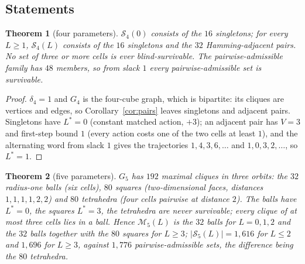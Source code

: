 \documentclass[11pt,a4paper]{article}
\theoremstyle{plain}
\newtheorem{theorem}{Theorem}[section]
\theoremstyle{definition}
\theoremstyle{remark}
\newcommand{\calM}{\mathcal{M}}
\newcommand{\calS}{\mathcal{S}}
\newcommand{\Lstar}{L^{\ast}}
\begin{document}
\subsection{Statements}
\begin{theorem}[four parameters]\label{thm:m4}
$\calS_4(0)$ consists of the $16$ singletons; for every $L\ge1$, $\calS_4(L)$ consists of the $16$ singletons and the $32$ Hamming-adjacent pairs. No set of three or more cells is ever blind-survivable. The pairwise-admissible family has $48$ members, so from slack $1$ every pairwise-admissible set is survivable.
\end{theorem}
\begin{proof}
$\delta_4=1$ and $G_4$ is the four-cube graph, which is bipartite: its cliques are vertices and edges, so Corollary~\ref{cor:pairs} leaves singletons and adjacent pairs. Singletons have $\Lstar=0$ (constant matched action, $+3$); an adjacent pair has $V=3$ and first-step bound $1$ (every action costs one of the two cells at least $1$), and the alternating word from slack $1$ gives the trajectories $1,4,3,6,\dots$ and $1,0,3,2,\dots$, so $\Lstar=1$.
\end{proof}

\begin{theorem}[five parameters]\label{thm:m5}
$G_5$ has $192$ maximal cliques in three orbits: the $32$ radius-one balls (six cells), $80$ \emph{squares} (two-dimensional faces, distances $1,1,1,1,2,2$) and $80$ \emph{tetrahedra} (four cells pairwise at distance $2$). The balls have $\Lstar=0$, the squares $\Lstar=3$, the tetrahedra are never survivable; every clique of at most three cells lies in a ball. Hence $\calM_5(L)$ is the $32$ balls for $L=0,1,2$ and the $32$ balls together with the $80$ squares for $L\ge3$; $|\calS_5(L)|=1{,}616$ for $L\le2$ and $1{,}696$ for $L\ge3$, against $1{,}776$ pairwise-admissible sets, the difference being the $80$ tetrahedra.
\end{theorem}
\end{document}
